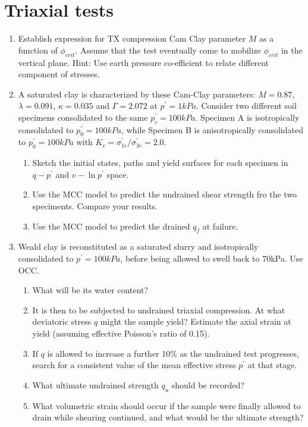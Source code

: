 \documentclass[a4paper,12pt]{article}
\begin{document}
\section{Triaxial tests}
\begin{enumerate}
	\item Establish expression for TX compression Cam Clay parameter $M$ as a function of $\phi_{crit}$. Assume that the test eventually come to mobilize $\phi_{crit}$ in the vertical plane. Hint: Use earth pressure co-efficient to relate different component of stresses. 
	
	\item A saturated clay is characterized by these Cam-Clay parameters: $M = 0.87$, $\lambda = 0.091$, $\kappa = 0.035$ and $\Gamma = 2.072$ at $p^\prime = 1 kPa$. 
	Consider two different soil specimens consolidated to the same $p_c^\prime = 100 kPa$. Specimen A is isotropically consolidated to $p_0^\prime = 100 kPa$, while Specimen B is anisotropically consolidated to $p_0^\prime = 100 kPa$ with $K_c = \sigma_{1c}^\prime / \sigma_{3c}^\prime = 2.0$. 
	\begin{enumerate}
		\item Sketch the initial states, paths and yield surfaces for each specimen in $q-p^\prime$ and $v - \ln p^\prime$ space. 
		\item Use the MCC model to predict the undrained shear strength fro the two speciments. Compare your results.
		\item Use the MCC model to predict the drained $q_f$ at failure.
	\end{enumerate}

	\item Weald clay is reconstituted as a saturated slurry and isotropically consolidated to $p^\prime = 100kPa$, before being allowed to swell back to 70kPa. Use OCC.
	\begin{enumerate}
		\item What will be its water content?
		\item It is then to be subjected to undrained triaxial compression. At what deviatoric stress $q$ might the sample yield? Estimate the axial strain at yield (assuming effective Poisson's ratio of 0.15).
		\item If $q$ is allowed to increase a further 10\% as the undrained test progresses, search for a consistent value of the mean effective stress $p^\prime$ at that stage.
		\item What ultimate undrained strength $q_u$ should be recorded?
		\item What volumetric strain should occur if the sample were finally allowed to drain while
		shearing continued, and what would be the ultimate strength?
	\end{enumerate}
\end{enumerate}
\end{document}
